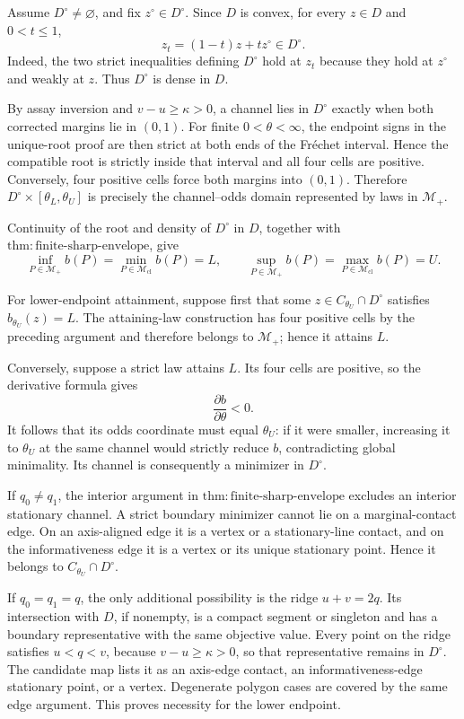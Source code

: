 Assume \(D^\circ\neq\varnothing\), and fix \(z^\circ\in D^\circ\). Since \(D\) is convex, for every \(z\in D\) and \(0<t\leq1\),
\[
z_t=(1-t)z+t z^\circ\in D^\circ.
\]
Indeed, the two strict inequalities defining \(D^\circ\) hold at \(z_t\) because they hold at \(z^\circ\) and weakly at \(z\). Thus \(D^\circ\) is dense in \(D\).

By assay inversion and \(v-u\geq\kappa>0\), a channel lies in \(D^\circ\) exactly when both corrected margins lie in \((0,1)\). For finite \(0<\theta<\infty\), the endpoint signs in the unique-root proof are then strict at both ends of the Fr\'echet interval. Hence the compatible root is strictly inside that interval and all four cells are positive. Conversely, four positive cells force both margins into \((0,1)\). Therefore \(D^\circ\times[\theta_L,\theta_U]\) is precisely the channel--odds domain represented by laws in \(\mathcal M_+\).

Continuity of the root and density of \(D^\circ\) in \(D\), together with \(\mathrm{thm:finite\text{-}sharp\text{-}envelope}\), give
\[
\inf_{P\in\mathcal M_+}b(P)
=\min_{P\in\mathcal M_{\mathrm{cl}}}b(P)=L,
\qquad
\sup_{P\in\mathcal M_+}b(P)
=\max_{P\in\mathcal M_{\mathrm{cl}}}b(P)=U.
\]

For lower-endpoint attainment, suppose first that some \(z\in C_{\theta_U}\cap D^\circ\) satisfies \(b_{\theta_U}(z)=L\). The attaining-law construction has four positive cells by the preceding argument and therefore belongs to \(\mathcal M_+\); hence it attains \(L\).

Conversely, suppose a strict law attains \(L\). Its four cells are positive, so the derivative formula gives
\[
\frac{\partial b}{\partial\theta}<0.
\]
It follows that its odds coordinate must equal \(\theta_U\): if it were smaller, increasing it to \(\theta_U\) at the same channel would strictly reduce \(b\), contradicting global minimality. Its channel is consequently a minimizer in \(D^\circ\).

If \(q_0\neq q_1\), the interior argument in \(\mathrm{thm:finite\text{-}sharp\text{-}envelope}\) excludes an interior stationary channel. A strict boundary minimizer cannot lie on a marginal-contact edge. On an axis-aligned edge it is a vertex or a stationary-line contact, and on the informativeness edge it is a vertex or its unique stationary point. Hence it belongs to \(C_{\theta_U}\cap D^\circ\).

If \(q_0=q_1=q\), the only additional possibility is the ridge \(u+v=2q\). Its intersection with \(D\), if nonempty, is a compact segment or singleton and has a boundary representative with the same objective value. Every point on the ridge satisfies \(u<q<v\), because \(v-u\geq\kappa>0\), so that representative remains in \(D^\circ\). The candidate map lists it as an axis-edge contact, an informativeness-edge stationary point, or a vertex. Degenerate polygon cases are covered by the same edge argument. This proves necessity for the lower endpoint.

